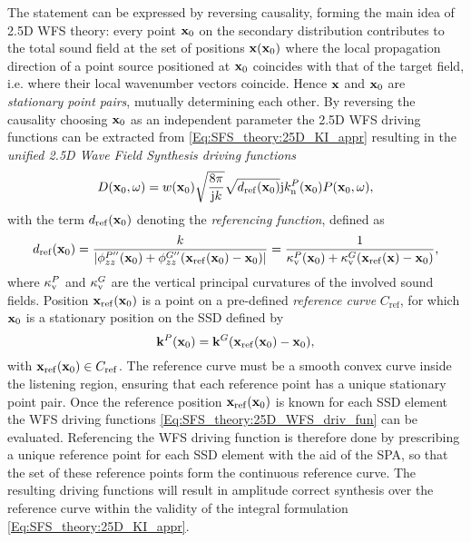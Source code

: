 The statement can be expressed by reversing causality, forming the main idea of 2.5D WFS theory: 
every point $\mathbf{x}_0$ on the secondary distribution contributes to the total sound field at the set of positions $\mathbf{x}(\mathbf{x}_0)$ where the local propagation direction of a point source positioned at $\mathbf{x}_0$ coincides with that of the target field, i.e. where their local wavenumber vectors coincide.
Hence $\mathbf{x}$ and $\mathbf{x}_0$ are \emph{stationary point pairs}, mutually determining each other.
By reversing the causality choosing $\mathbf{x}_0$ as an independent parameter the 2.5D WFS driving functions can be extracted from \eqref{Eq:SFS_theory:25D_KI_appr} resulting in the \emph{unified 2.5D Wave Field Synthesis driving functions}
\begin{equation}
D(\mathbf{x}_0, \omega) = w(\mathbf{x}_0) 
\sqrt{\frac{8\pi}{\mathrm{j} k}}\sqrt{d_{\mathrm{ref}}(\mathbf{x}_0)}
\mathrm{j} k_{\mathrm{n}}^P(\mathbf{x}_0) 	P(\mathbf{x}_0,\omega),
\label{Eq:SFS_theory:25D_WFS_driv_fun}
\end{equation}
with the term $d_{\mathrm{ref}}(\mathbf{x}_0)$ denoting the \emph{referencing function}, defined as
\begin{equation}
\label{Eq:SFS_theory:Referencing function}
d_{\mathrm{ref}}(\mathbf{x}_0) = \frac{k}{|\phi^{P''}_{zz}(\mathbf{x}_0) +\phi^{G''}_{zz}(\mathbf{x}_{\mathrm{ref}}(\mathbf{x}_0)-\mathbf{x}_0)|} = \frac{1}{\kappa_\mathrm{v}^P(\mathbf{x}_0)+ \kappa_\mathrm{v}^G(\mathbf{x}_{\mathrm{ref}}(\mathbf{x})-\mathbf{x}_0)},
\end{equation}
where $\kappa_\mathrm{v}^P$ and $\kappa_\mathrm{v}^G$ are the vertical principal curvatures of the involved sound fields.
Position $\mathbf{x}_{\mathrm{ref}}(\mathbf{x}_0)$ is a point on a pre-defined \emph{reference curve} $C_{\mathrm{ref}}$, for which $\mathbf{x}_0$ is a stationary position on the SSD defined by
\begin{equation}
\mathbf{k}^P(\mathbf{x}_0) = \mathbf{k}^G(\mathbf{x}_{\mathrm{ref}}(\mathbf{x}_0) - \mathbf{x}_0),
\label{Eq:SFS_theory:WFS_General_Stat_pos}
\end{equation}
with $\mathbf{x}_{\mathrm{ref}}(\mathbf{x}_0) \in C_{\mathrm{ref}}$.
The reference curve must be a smooth convex curve inside the listening region, ensuring that each reference point has a unique stationary point pair.
Once the reference position $\mathbf{x}_{\mathrm{ref}}(\mathbf{x}_0)$ is known for each SSD element the WFS driving functions \eqref{Eq:SFS_theory:25D_WFS_driv_fun} can be evaluated.
Referencing the WFS driving function is therefore done by prescribing a unique reference point for each SSD element with the aid of the SPA, so that the set of these reference points form the continuous reference curve.
The resulting driving functions will result in amplitude correct synthesis over the reference curve within the validity of the integral formulation \eqref{Eq:SFS_theory:25D_KI_appr}.

